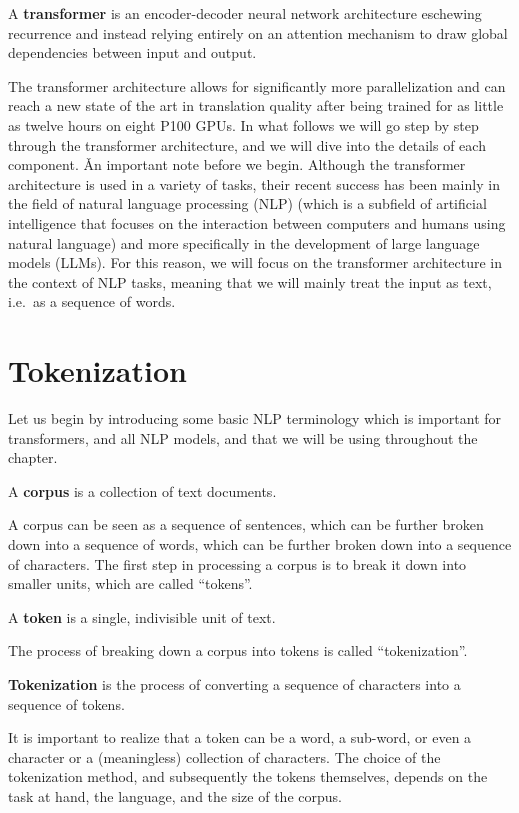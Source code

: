 \bd[Transformer]
A \textbf{transformer} is an encoder-decoder neural network architecture eschewing recurrence and instead relying
entirely on an attention mechanism to draw global dependencies between input and output.
\ed

The transformer architecture allows for significantly more parallelization and can reach a new state of the art in
translation quality after being trained for as little as twelve hours on eight P100 GPUs. In what follows we will go
step by step through the transformer architecture, and we will dive into the details of each component. \v

An important note before we begin. Although the transformer architecture is used in a variety of tasks, their recent
success has been mainly in the field of natural language processing (NLP) (which is a subfield of artificial
intelligence that focuses on the interaction between computers and humans using natural language) and more
specifically in the development of large language models (LLMs). For this reason, we will focus on the transformer
architecture in the context of NLP tasks, meaning that we will mainly treat the input as text, i.e.\ as a sequence
of words.


\section{Tokenization}

Let us begin by introducing some basic NLP terminology which is important for transformers, and all NLP models, and
that we will be using throughout the chapter.

\bd[Corpus]
A \textbf{corpus} is a collection of text documents.
\ed

A corpus can be seen as a sequence of sentences, which can be further broken down into a sequence of words, which can
be further broken down into a sequence of characters. The first step in processing a corpus is to break it down into
smaller units, which are called ``tokens''.

\bd[Token]
A \textbf{token} is a single, indivisible unit of text.
\ed

The process of breaking down a corpus into tokens is called ``tokenization''.

\bd[Tokenization]
\textbf{Tokenization} is the process of converting a sequence of characters into a sequence of tokens.
\ed

It is important to realize that a token can be a word, a sub-word, or even a character or a (meaningless) collection
of characters. The choice of the tokenization method, and subsequently the tokens themselves, depends on the task at
hand, the language, and the size of the corpus.

